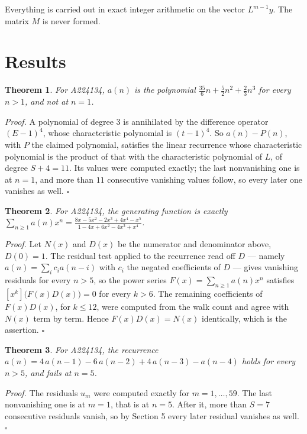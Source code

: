 \documentclass[11pt]{article}
\newtheorem{theorem}{Theorem}
\theoremstyle{definition}
\begin{document}
Everything is carried out in exact integer arithmetic on the vector $L^{m-1}y$. The matrix $M$ is never formed.

\section{Results}

\begin{theorem} For A224134, $a(n)$ is the polynomial $\frac{35}{6}n + \frac{5}{2}n^{2} + \frac{2}{3}n^{3}$ for every $n > 1$, and not at $n = 1$.\end{theorem}

{\itshape Proof.} A polynomial of degree $3$ is annihilated by the difference operator $(E-1)^{4}$, whose characteristic polynomial is $(t-1)^{4}$. So $a(n) - P(n)$, with $P$ the claimed polynomial, satisfies the linear recurrence whose characteristic polynomial is the product of that with the characteristic polynomial of $L$, of degree $S + 4 = 11$. Its values were computed exactly; the last nonvanishing one is at $n = 1$, and more than $11$ consecutive vanishing values follow, so every later one vanishes as well. $\square$

\begin{theorem} For A224134, the generating function is exactly $\sum_{n\ge 1} a(n)x^n = \frac{8x - 5x^{2} - 2x^{3} + 4x^{4} - x^{5}}{1 - 4x + 6x^{2} - 4x^{3} + x^{4}}$.\end{theorem}

{\itshape Proof.} Let $N(x)$ and $D(x)$ be the numerator and denominator above, $D(0)=1$. The residual test applied to the recurrence read off $D$ --- namely $a(n) = \sum_i c_i a(n-i)$ with $c_i$ the negated coefficients of $D$ --- gives vanishing residuals for every $n > 5$, so the power series $F(x)=\sum_{n\ge 1}a(n)x^n$ satisfies $[x^k]\bigl(F(x)D(x)\bigr) = 0$ for every $k > 6$. The remaining coefficients of $F(x)D(x)$, for $k \le 12$, were computed from the walk count and agree with $N(x)$ term by term. Hence $F(x)D(x) = N(x)$ identically, which is the assertion. $\square$

\begin{theorem} For A224134, the recurrence $a(n) = 4\,a(n-1) - 6\,a(n-2) + 4\,a(n-3) - a(n-4)$ holds for every $n > 5$, and fails at $n = 5$.\end{theorem}

{\itshape Proof.} The residuals $u_m$ were computed exactly for $m = 1,\dots,59$. The last nonvanishing one is at $m = 1$, that is at $n = 5$. After it, more than $S = 7$ consecutive residuals vanish, so by Section 5 every later residual vanishes as well. $\square$
\end{document}
